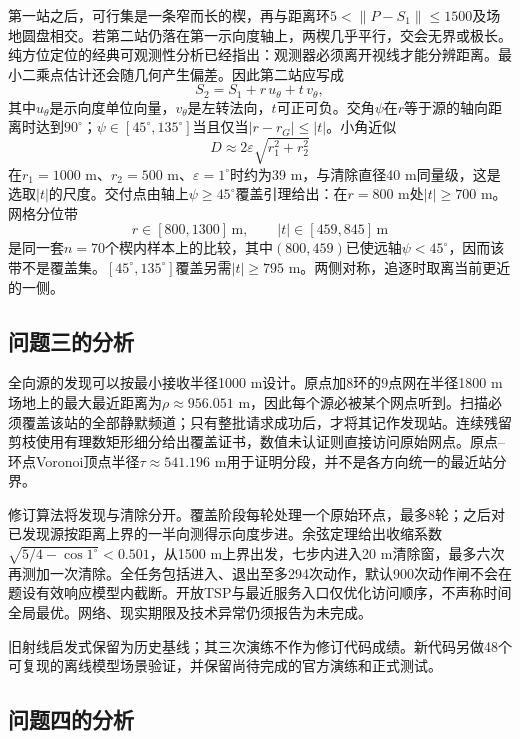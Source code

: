 \documentclass{cumcmthesis}
\begin{document}
第一站之后，可行集是一条窄而长的楔，再与距离环$5<\|P-S_1\|\le 1500$及场地圆盘相交。若第二站仍落在第一示向度轴上，两楔几乎平行，交会无界或极长。纯方位定位的经典可观测性分析已经指出：观测器必须离开视线才能分辨距离\cite{nardone1984}。最小二乘点估计还会随几何产生偏差\cite{dogancay2005}。因此第二站应写成
\begin{equation}
S_2=S_1+r\,u_{\theta}+t\,v_{\theta},
\label{eq:s2}
\end{equation}
其中$u_{\theta}$是示向度单位向量，$v_{\theta}$是左转法向，$t$可正可负。交角$\psi$在$r$等于源的轴向距离时达到$90^\circ$；$\psi\in[45^\circ,135^\circ]$当且仅当$|r-r_G|\le|t|$。小角近似
\begin{equation}
D\approx 2\varepsilon\sqrt{r_1^2+r_2^2}
\label{eq:smallang}
\end{equation}
在$r_1=1000$ m、$r_2=500$ m、$\varepsilon=1^\circ$时约为39 m，与清除直径40 m同量级，这是选取$|t|$的尺度。交付点由轴上$\psi\ge 45^\circ$覆盖引理给出：在$r=800$ m处$|t|\ge 700$ m。网格分位带
\[
r\in[800,1300]\,\mathrm{m},\qquad |t|\in[459,845]\,\mathrm{m}
\]
是同一套$n=70$个楔内样本上的比较，其中$(800,459)$已使远轴$\psi<45^\circ$，因而该带不是覆盖集。$[45^\circ,135^\circ]$覆盖另需$|t|\ge 795$ m。两侧对称，追逐时取离当前更近的一侧。

\subsection{问题三的分析}

全向源的发现可以按最小接收半径1000 m设计。原点加8环的9点网在半径1800 m场地上的最大最近距离为$\rho\approx956.051$ m，因此每个源必被某个网点听到。扫描必须覆盖该站的全部静默频道；只有整批请求成功后，才将其记作发现站。连续残留剪枝使用有理数矩形细分给出覆盖证书，数值未认证则直接访问原始网点。原点--环点Voronoi顶点半径$\tau\approx541.196$ m用于证明分段，并不是各方向统一的最近站分界。

修订算法将发现与清除分开。覆盖阶段每轮处理一个原始环点，最多8轮；之后对已发现源按距离上界的一半向测得示向度步进。余弦定理给出收缩系数$\sqrt{5/4-\cos1^\circ}<0.501$，从1500 m上界出发，七步内进入20 m清除窗，最多六次再测加一次清除。全任务包括进入、退出至多294次动作，默认900次动作闸不会在题设有效响应模型内截断。开放TSP与最近服务入口仅优化访问顺序，不声称时间全局最优。网络、现实期限及技术异常仍须报告为未完成。

旧射线启发式保留为历史基线；其三次演练不作为修订代码成绩。新代码另做48个可复现的离线模型场景验证，并保留尚待完成的官方演练和正式测试。

\subsection{问题四的分析}
\end{document}
